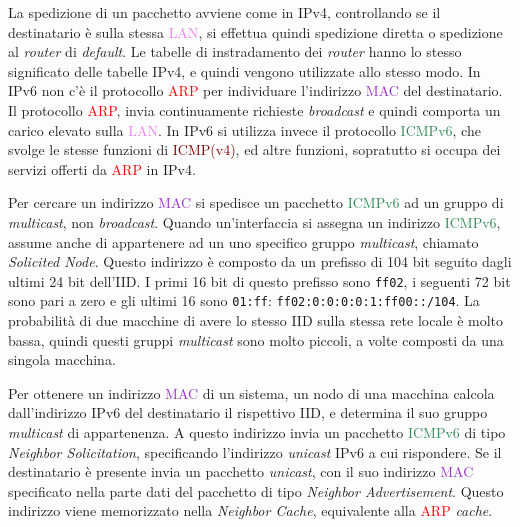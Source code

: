 \documentclass{article}
\numberwithin{equation}{subsection}
\begin{document}
La spedizione di un pacchetto avviene come in \textcolor{BurntOrange}{IPv4}, controllando se il destinatario è sulla stessa \textcolor{violet}{LAN}, si effettua quindi spedizione diretta o spedizione 
al \textit{router} di \textit{default}. 
Le tabelle di instradamento dei \textit{router} hanno lo stesso significato delle tabelle \textcolor{BurntOrange}{IPv4}, e quindi vengono utilizzate allo stesso modo. In \textcolor{OliveGreen}{IPv6} non c'è il protocollo \textcolor{Red}{ARP} per individuare 
l'indirizzo \textcolor{DarkOrchid}{MAC} del destinatario. Il protocollo \textcolor{Red}{ARP}, invia continuamente richieste \textit{broadcast} e quindi comporta un carico elevato sulla \textcolor{violet}{LAN}. In \textcolor{OliveGreen}{IPv6} si utilizza invece 
il protocollo \textcolor{SeaGreen}{ICMPv6}, che svolge le stesse funzioni di \textcolor{Maroon}{ICMP(v4)}, ed altre funzioni, sopratutto si occupa dei servizi offerti da \textcolor{Red}{ARP} in \textcolor{BurntOrange}{IPv4}. 

Per cercare un indirizzo \textcolor{DarkOrchid}{MAC} si spedisce un pacchetto \textcolor{SeaGreen}{ICMPv6} ad un gruppo di \textit{multicast}, non \textit{broadcast}. Quando un'interfaccia si assegna un indirizzo \textcolor{SeaGreen}{ICMPv6}, 
assume anche di appartenere ad un uno specifico gruppo \textit{multicast}, chiamato \textit{Solicited Node}. Questo indirizzo è composto da un prefisso di 104 bit seguito dagli ultimi 24 bit dell'IID. I primi 16 bit di questo prefisso sono \texttt{ff02}, i seguenti 72 bit sono pari a zero e gli ultimi 16 sono \texttt{01:ff}: \texttt{ff02:0:0:0:0:1:ff00::/104}. 
La probabilità di due macchine di avere lo stesso IID sulla stessa rete locale è molto bassa, quindi questi gruppi \textit{multicast} sono molto piccoli, a volte composti da una 
singola macchina. 


Per ottenere un indirizzo \textcolor{DarkOrchid}{MAC} di un sistema, un nodo di una macchina calcola dall'indirizzo \textcolor{OliveGreen}{IPv6} del destinatario il rispettivo IID, e determina il suo gruppo \textit{multicast} di appartenenza. A questo indirizzo invia un pacchetto \textcolor{SeaGreen}{ICMPv6} di tipo \textit{Neighbor Solicitation}, specificando l'indirizzo \textit{unicast} \textcolor{OliveGreen}{IPv6} a cui rispondere. Se il destinatario è presente invia un pacchetto \textit{unicast}, con il suo 
indirizzo \textcolor{DarkOrchid}{MAC} specificato nella parte dati del pacchetto di tipo \textit{Neighbor Advertisement}. 
Questo indirizzo viene memorizzato nella \textit{Neighbor Cache}, equivalente alla \textcolor{Red}{ARP} \textit{cache}. 
\end{document}
